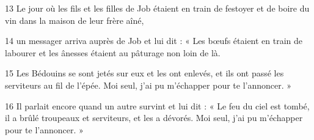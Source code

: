 13 Le jour où les fils et les filles de Job étaient en train de festoyer et de boire du vin dans la maison de leur frère aîné,

14 un messager arriva auprès de Job et lui dit : « Les bœufs étaient en train de labourer et les ânesses étaient au pâturage non loin de là.

15 Les Bédouins se sont jetés sur eux et les ont enlevés, et ils ont passé les serviteurs au fil de l’épée. Moi seul, j’ai pu m’échapper pour te l’annoncer. »

16 Il parlait encore quand un autre survint et lui dit : « Le feu du ciel est tombé, il a brûlé troupeaux et serviteurs, et les a dévorés. Moi seul, j’ai pu m’échapper pour te l’annoncer. »
